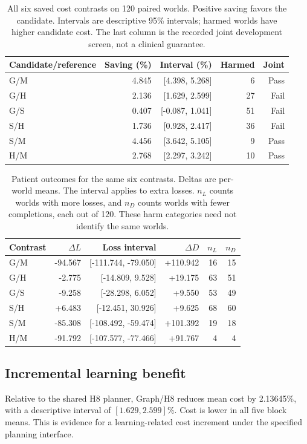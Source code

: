 \documentclass[preprint,12pt]{elsarticle}
\begin{document}
\begin{table}[t]
\centering
\caption{All six saved cost contrasts on 120 paired worlds. Positive saving
favors the candidate. Intervals are descriptive 95\% intervals; harmed worlds
have higher candidate cost. The last column is the recorded joint development
screen, not a clinical guarantee.}
\label{tab:cost}
\small
\begin{tabular}{lrrrr}
\toprule
Candidate/reference & Saving (\%) & Interval (\%) & Harmed & Joint\\
\midrule
G/M & 4.845 & [4.398, 5.268] & 6 & Pass \\
G/H & 2.136 & [1.629, 2.599] & 27 & Fail \\
G/S & 0.407 & [-0.087, 1.041] & 51 & Fail \\
S/H & 1.736 & [0.928, 2.417] & 36 & Fail \\
S/M & 4.456 & [3.642, 5.105] & 9 & Pass \\
H/M & 2.768 & [2.297, 3.242] & 10 & Pass \\
\bottomrule
\end{tabular}
\end{table}

\begin{table}[t]
\centering
\caption{Patient outcomes for the same six contrasts. Deltas are per-world
means. The interval applies to extra losses. $n_L$ counts worlds with more
losses, and $n_D$ counts worlds with fewer completions, each out of 120.
These harm categories need not identify the same worlds.}
\label{tab:service}
\small
\setlength{\tabcolsep}{4pt}
\begin{tabular}{lrrrrr}
\toprule
Contrast & $\Delta L$ & Loss interval & $\Delta D$ & $n_L$ & $n_D$\\
\midrule
G/M & -94.567 & [-111.744, -79.050] & +110.942 & 16 & 15 \\
G/H & -2.775 & [-14.809, 9.528] & +19.175 & 63 & 51 \\
G/S & -9.258 & [-28.298, 6.052] & +9.550 & 53 & 49 \\
S/H & +6.483 & [-12.451, 30.926] & +9.625 & 68 & 60 \\
S/M & -85.308 & [-108.492, -59.474] & +101.392 & 19 & 18 \\
H/M & -91.792 & [-107.577, -77.466] & +91.767 & 4 & 4 \\
\bottomrule
\end{tabular}
\end{table}

\subsection{Incremental learning benefit}
Relative to the shared H8 planner, Graph/H8 reduces mean cost by 2.13645\%,
with a descriptive interval of $[1.629,2.599]\%$. Cost is lower in all five
block means. This is evidence for a learning-related cost increment under the
specified planning interface.
\end{document}
